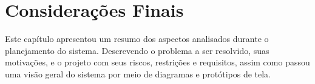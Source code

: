 \newpage

\section{Considerações Finais}

Este capítulo apresentou um resumo dos aspectos analisados durante o planejamento do sistema.
Descrevendo o problema a ser resolvido, suas motivações, e o projeto com seus riscos, restrições
e requisitos, assim como passou uma visão geral do sistema por meio de diagramas e protótipos de tela.